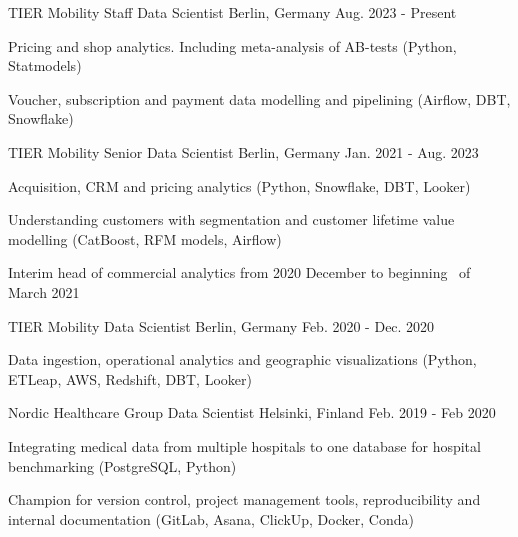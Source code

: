 
\begin{cventries}


  \cventry
    {TIER Mobility} %
    {Staff Data Scientist} %
    {Berlin, Germany} %
    {Aug. 2023 - Present} %
    {
      \begin{cvitems}
        \item {Pricing and shop analytics. Including meta-analysis of AB-tests (Python, Statmodels)}
        \item {Voucher, subscription and payment data modelling and pipelining (Airflow, DBT, Snowflake)}
      \end{cvitems}
    }

  \cventry
    {TIER Mobility} %
    {Senior Data Scientist} %
    {Berlin, Germany} %
    {Jan. 2021 - Aug. 2023} %
    {
      \begin{cvitems}
        \item {Acquisition, CRM and pricing analytics (Python, Snowflake, DBT, Looker)}
        \item {Understanding customers with segmentation and customer lifetime
        value modelling (CatBoost, RFM models, Airflow)}
        \item {Interim head of commercial analytics from 2020 December to beginning \
        of March 2021}
      \end{cvitems}
    }

  \cventry
    {TIER Mobility} %
    {Data Scientist} %
    {Berlin, Germany} %
    {Feb. 2020 - Dec. 2020} %
    {
      \begin{cvitems}
        \item {Data ingestion, operational analytics and geographic
        visualizations (Python, ETLeap, AWS, Redshift, DBT, Looker)}
      \end{cvitems}
    }

  \cventry
    {Nordic Healthcare Group} %
    {Data Scientist} %
    {Helsinki, Finland} %
    {Feb. 2019 - Feb 2020} %
    {
      \begin{cvitems}
        \item {Integrating medical data from multiple hospitals to one database for hospital benchmarking
        (PostgreSQL, Python)}
        \item {Champion for version control, project management tools,
        reproducibility and internal documentation (GitLab, Asana, ClickUp, Docker, Conda)}
      \end{cvitems}
    }


\end{cventries}
